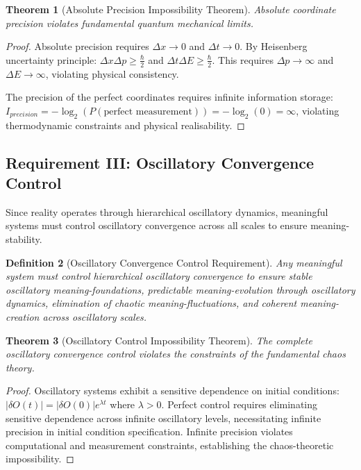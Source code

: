 \documentclass[12pt,a4paper]{article}
\newtheorem{theorem}{Theorem}[section]
\newtheorem{definition}[theorem]{Definition}
\begin{document}
\begin{theorem}[Absolute Precision Impossibility Theorem]
Absolute coordinate precision violates fundamental quantum mechanical limits.
\end{theorem}

\begin{proof}
Absolute precision requires $\Delta x \to 0$ and $\Delta t \to 0$. By Heisenberg uncertainty principle: $\Delta x \Delta p \geq \frac{\hbar}{2}$ and $\Delta t \Delta E \geq \frac{\hbar}{2}$. This requires $\Delta p \to \infty$ and $\Delta E \to \infty$, violating physical consistency.

 The precision of the perfect coordinates requires infinite information storage: $I_{precision} = -\log_2(P(\text{perfect measurement})) = -\log_2(0) = \infty$, violating thermodynamic constraints and physical realisability.
\end{proof}

\subsection{Requirement III: Oscillatory Convergence Control}

Since reality operates through hierarchical oscillatory dynamics, meaningful systems must control oscillatory convergence across all scales to ensure meaning-stability.

\begin{definition}[Oscillatory Convergence Control Requirement]
Any meaningful system must control hierarchical oscillatory convergence to ensure stable oscillatory meaning-foundations, predictable meaning-evolution through oscillatory dynamics, elimination of chaotic meaning-fluctuations, and coherent meaning-creation across oscillatory scales.
\end{definition}

\begin{theorem}[Oscillatory Control Impossibility Theorem]
The complete oscillatory convergence control violates the constraints of the fundamental chaos theory.
\end{theorem}

\begin{proof}
Oscillatory systems exhibit a sensitive dependence on initial conditions: $|\delta O(t)| = |\delta O(0)| e^{\lambda t}$ where $\lambda > 0$. Perfect control requires eliminating sensitive dependence across infinite oscillatory levels, necessitating infinite precision in initial condition specification. Infinite precision violates computational and measurement constraints, establishing the chaos-theoretic impossibility.
\end{proof}
\end{document}
